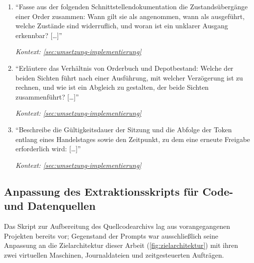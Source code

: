 \begin{enumerate}
    \item \enquote{Fasse aus der folgenden Schnittstellendokumentation die
            Zustandsübergänge einer Order zusammen: Wann gilt sie als
            angenommen, wann als ausgeführt, welche Zustände sind
            widerruflich, und woran ist ein unklarer Ausgang erkennbar?
            [\dots]}
            \par\hfill\textit{Kontext: \cref{sec:umsetzung-implementierung}}

    \item \enquote{Erläutere das Verhältnis von Orderbuch und Depotbestand:
            Welche der beiden Sichten führt nach einer Ausführung, mit welcher
            Verzögerung ist zu rechnen, und wie ist ein Abgleich zu
            gestalten, der beide Sichten zusammenführt? [\dots]}
            \par\hfill\textit{Kontext: \cref{sec:umsetzung-implementierung}}

    \item \enquote{Beschreibe die Gültigkeitsdauer der Sitzung und die
            Abfolge der Token entlang eines Handelstages sowie den Zeitpunkt,
            zu dem eine erneute Freigabe erforderlich wird: [\dots]}
            \par\hfill\textit{Kontext: \cref{sec:umsetzung-implementierung}}
\end{enumerate}

\subsection{Anpassung des Extraktionsskripts für Code- und Datenquellen}
\label{sec:prompts-claude-extraktion}

Das Skript zur Aufbereitung des Quellcodearchivs lag aus vorangegangenen
Projekten bereits vor; Gegenstand der Prompts war ausschließlich seine
Anpassung an die Zielarchitektur dieser Arbeit (\cref{fig:zielarchitektur})
mit ihren zwei virtuellen Maschinen, Journaldateien und zeitgesteuerten
Aufträgen.

